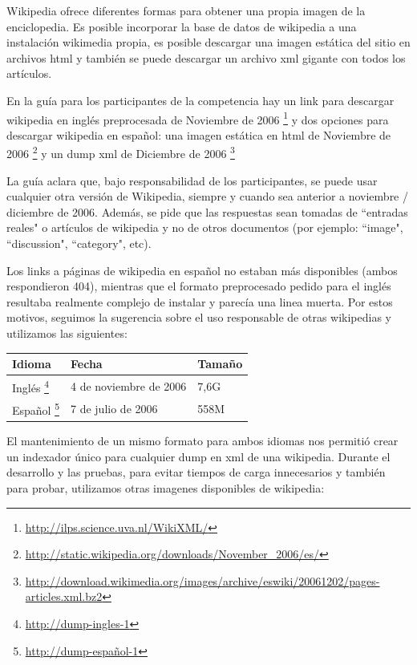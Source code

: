 Wikipedia ofrece diferentes formas para obtener una propia imagen de la enciclopedia.
Es posible incorporar la base de datos de wikipedia a una instalación wikimedia
propia, es posible descargar una imagen estática del sitio en archivos html y también se puede
descargar un archivo xml gigante con todos los artículos. 

En la guía para los participantes de la competencia \cite{Clef07} hay un link para descargar 
wikipedia en inglés preprocesada de Noviembre de 2006 \footnote{\url{http://ilps.science.uva.nl/WikiXML/}} y dos opciones para descargar wikipedia en español: una imagen estática en html de Noviembre de 2006 \footnote{\url{http://static.wikipedia.org/downloads/November_2006/es/}} y un dump xml de Diciembre de 2006 
\footnote{\url{http://download.wikimedia.org/images/archive/eswiki/20061202/pages-articles.xml.bz2}}

La guía aclara que, bajo responsabilidad de los participantes, se puede usar
cualquier otra versión de Wikipedia, siempre y cuando sea anterior a noviembre / diciembre de 2006.
Además, se pide que las respuestas sean tomadas de ``entradas reales" o artículos de wikipedia y
no de otros documentos (por ejemplo: ``image", ``discussion", ``category", etc).

Los links a páginas de wikipedia en español no estaban más disponibles (ambos respondieron 404), mientras que el formato
preprocesado pedido para el inglés resultaba realmente complejo de instalar y parecía una linea muerta. Por estos motivos,
seguimos la sugerencia sobre el uso responsable de otras wikipedias y utilizamos las siguientes:

\medskip

\begin{center}
\begin{tabular}{ | l | l | l |}
    \hline
    Idioma & Fecha & Tamaño\\ \hline
    Inglés \footnote{\url{http://dump-ingles-1}} & 4 de noviembre de 2006 & 7,6G \\ \hline
    Español \footnote{\url{http://dump-español-1}} & 7 de julio de 2006 & 558M \\ \hline
\end{tabular}  
\end{center}

El mantenimiento de un mismo formato para ambos idiomas nos permitió crear un indexador único para cualquier
dump en xml de una wikipedia. Durante el desarrollo y las pruebas, para evitar tiempos de carga innecesarios y también
para probar, utilizamos otras imagenes disponibles de wikipedia:

